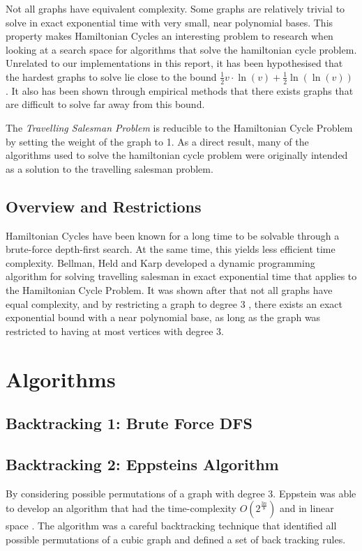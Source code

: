 Not all graphs have equivalent complexity. Some graphs are relatively trivial to
solve in exact exponential time with very small, near polynomial bases. This
property makes Hamiltonian Cycles an interesting problem to research when
looking at a search space for algorithms that solve the hamiltonian cycle
problem. Unrelated to our implementations in this report, it has been
hypothesised that the hardest graphs to solve lie close to the bound
$\frac{1}{2} v \cdot \ln(v)+\frac{1}{2} \ln(\ln(v))$ \cite{Szem2006}. It also
has been shown through empirical methods \cite{Berg2021} that there exists
graphs that are difficult to solve far away from this bound. 

The \emph{Travelling Salesman Problem} is reducible to the Hamiltonian Cycle
Problem by setting the weight of the graph to 1. As a direct result, many of the
algorithms used to solve the hamiltonian cycle problem were originally intended
as a solution to the travelling salesman problem.

\subsection{Overview and Restrictions}

Hamiltonian Cycles have been known for a long time to be solvable through a
brute-force depth-first search. At the same time, this yields less efficient
time complexity. Bellman\cite{Bell1962}, Held and Karp\cite{Karp1962} developed
a dynamic programming algorithm for solving travelling salesman in exact
exponential time that applies to the Hamiltonian Cycle Problem. It was shown
after that not all graphs have equal complexity, and by restricting a graph to
degree 3 \cite{Epps2007}, there exists an exact exponential bound with a near
polynomial base, as long as the graph was restricted to having at most vertices
with degree 3.

\newpage

\section{Algorithms}

\subsection{Backtracking 1: Brute Force DFS}

\subsection{Backtracking 2: Eppsteins Algorithm}

By considering possible permutations of a graph with degree 3. Eppstein was able
to develop an algorithm that had the time-complexity $O(2^{\frac{3n}{8}})$ and
in linear space \cite{Epps2007}. The algorithm was a careful backtracking
technique that identified all possible permutations of a cubic graph and defined
a set of back tracking rules.

